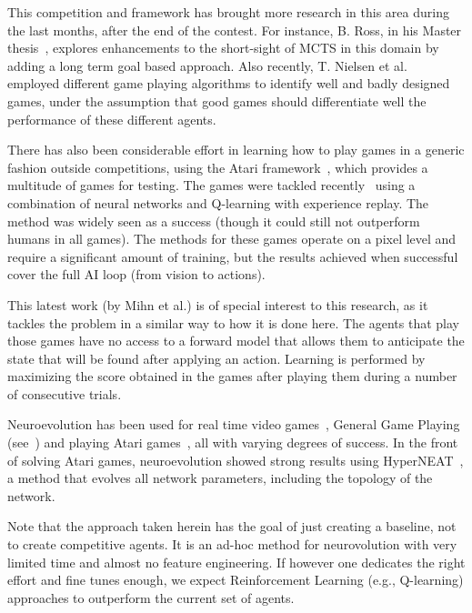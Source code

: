 \documentclass[conference]{IEEEtran}
\begin{document}
This competition and framework has brought more research in this area during the last months, after the end of the contest. For instance, B. Ross, in his Master thesis~\cite{Ross2014}, explores enhancements to the short-sight of MCTS in this domain by adding a long term goal based approach. Also recently, T. Nielsen et al.~\cite{Nielsen2015} employed different game playing algorithms to identify well and badly designed games, under the assumption that good games should differentiate well the performance of these different agents.

There has also been considerable effort in learning how to play games in a generic fashion outside competitions,  using the Atari framework~\cite{13jair}, which provides a multitude of games for testing. The games were tackled recently~\cite{mnih2015human} using a combination of neural networks and Q-learning with experience replay. The method was widely seen as a success (though it could still not outperform humans in all games). The methods for these games operate on a pixel level and require a significant amount of training, but the results achieved when successful cover the full AI loop (from vision to actions). 

This latest work (by Mihn et al.) is of special interest to this research, as it tackles the problem in a similar way to how it is done here. The agents that play those games have no access to a forward model that allows them to anticipate the state that will be found after applying an action. Learning is performed by maximizing the score obtained in the games after playing them during a number of consecutive trials. 

Neuroevolution has been used for real time video games~\cite{stanley2005real},  General Game Playing (see~\cite{reisinger2007coevolving}) and playing Atari games~\cite{hausknecht2012hyperneat, hausknecht2014neuroevolution}, all with varying degrees of success. In the front of solving Atari games, neuroevolution showed strong results using HyperNEAT~\cite{gauci2010autonomous}, a method that evolves all network parameters, including the topology of the network. 

Note that the approach taken herein has the goal of just creating a baseline, not to create competitive agents. It is an ad-hoc method for neurovolution with very limited time and almost no feature engineering. If however one dedicates the right effort and fine tunes enough, we expect Reinforcement Learning (e.g., Q-learning) approaches to outperform the current set of agents. 
\end{document}

